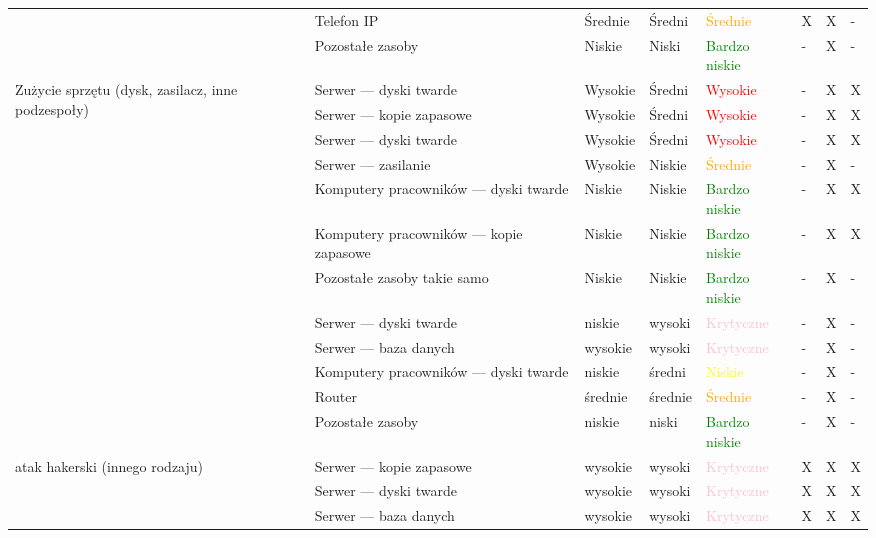 \begin{landscape}
\begin{longtable}[ht!]{|m{3cm}|m{6cm}|m{4.5cm}|m{3cm}|m{3cm}|m{0.5cm}|m{0.5cm}|m{0.5cm}|}
		& Telefon IP & Średnie & Średni & \textcolor{orange}{Średnie} & X & X & - \\ \cline{2-8}
		& Pozostałe zasoby & Niskie & Niski & \textcolor{green}{Bardzo niskie} & - & X & -  \\ \cline{2-8}
		\hline
		\multirow{6}{4cm}{Zużycie sprzętu (dysk, zasilacz, inne podzespoły)}
		& Serwer --- dyski twarde & Wysokie & Średni & \textcolor{red}{Wysokie} & - & X & X  \\ \cline{2-8}
		& Serwer --- kopie zapasowe & Wysokie & Średni & \textcolor{red}{Wysokie} & - & X & X  \\ \cline{2-8}
		& Serwer --- dyski twarde & Wysokie & Średni & \textcolor{red}{Wysokie} & - & X & X  \\ \cline{2-8}
		& Serwer --- zasilanie & Wysokie &Niskie & \textcolor{orange}{Średnie} & - & X & -  \\ \cline{2-8}
		& Komputery pracowników --- dyski twarde & Niskie & Niskie & \textcolor{green}{Bardzo niskie} & - & X & X  \\ \cline{2-8}
		& Komputery pracowników --- kopie zapasowe & Niskie & Niskie & \textcolor{green}{Bardzo niskie} & - & X & X  \\ \cline{2-8}
		& Pozostałe zasoby takie samo & Niskie & Niskie & \textcolor{green}{Bardzo niskie} & - & X & -  \\
		\hline
		\newpage
		\hline
		\multirow{4}{4cm}{atak DDoS}
		& Serwer --- dyski twarde & niskie  & wysoki & \textcolor{pink}{Krytyczne} & - & X & -  \\ \cline{2-8}
		& Serwer --- baza danych & wysokie & wysoki & \textcolor{pink}{Krytyczne} & - & X & -  \\ \cline{2-8} 
		& Komputery pracowników --- dyski twarde  & niskie  & średni & \textcolor{yellow}{Niskie} & - & X & -  \\ \cline{2-8}
		& Router & średnie  & średnie & \textcolor{orange}{Średnie} & - & X & -  \\ \cline{2-8} 
		& Pozostałe zasoby & niskie  & niski & \textcolor{green}{Bardzo niskie} & - & X & -  \\
		\hline
		\multirow{8}{4cm}{atak hakerski \linebreak (innego rodzaju)}
		& Serwer --- kopie zapasowe  & wysokie & wysoki & \textcolor{pink}{Krytyczne} & X & X & X  \\ \cline{2-8}
		& Serwer --- dyski twarde & wysokie  & wysoki & \textcolor{pink}{Krytyczne} & X & X & X  \\ \cline{2-8}
		& Serwer --- baza danych & wysokie & wysoki & \textcolor{pink}{Krytyczne} & X & X & X  \\ \cline{2-8}

\end{longtable}
\end{landscape}

